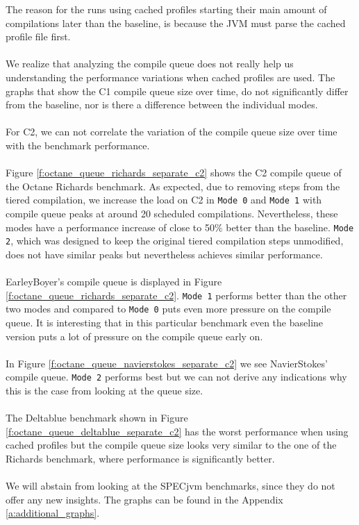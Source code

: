 The reason for the runs using cached profiles starting their main amount of compilations later than the baseline, is because the JVM must parse the cached profile file first.
\\\\
We realize that analyzing the compile queue does not really help us understanding the performance variations when cached profiles are used.
The graphs that show the C1 compile queue size over time, do not significantly differ from the baseline, nor is there a difference between the individual modes.
\\\\
For C2, we can not correlate the variation of the compile queue size over time with the benchmark performance.
\\\\
Figure \ref{f:octane_queue_richards_separate_c2} shows the C2 compile queue of the Octane Richards benchmark. As expected, due to removing steps from the tiered compilation, we increase the load on C2 in \texttt{Mode 0} and \texttt{Mode 1} with compile queue peaks at around 20 scheduled compilations. Nevertheless, these modes have a performance increase of close to 50\% better than the baseline. \texttt{Mode 2}, which was designed to keep the original tiered compilation steps unmodified, does not have similar peaks but nevertheless achieves similar performance.
\\\\
EarleyBoyer's compile queue is displayed in Figure \ref{f:octane_queue_richards_separate_c2}. \texttt{Mode 1} performs better than the other two modes and compared to \texttt{Mode 0} puts even more pressure on the compile queue.
It is interesting that in this particular benchmark even the baseline version puts a lot of pressure on the compile queue early on.
\\\\
In Figure \ref{f:octane_queue_navierstokes_separate_c2} we see NavierStokes' compile queue. \texttt{Mode 2} performs best but we can not derive any indications why this is the case from looking at the queue size.
\\\\
The Deltablue benchmark shown in Figure \ref{f:octane_queue_deltablue_separate_c2} has the worst performance when using cached profiles but the compile queue size looks very similar to the one of the Richards benchmark, where performance is significantly better.
\\\\
We will abstain from looking at the SPECjvm benchmarks, since they do not offer any new insights. The graphs can be found in the Appendix \ref{a:additional_graphs}.
